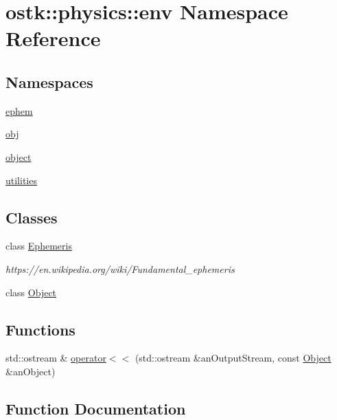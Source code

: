 \hypertarget{namespaceostk_1_1physics_1_1env}{}\section{ostk\+:\+:physics\+:\+:env Namespace Reference}
\label{namespaceostk_1_1physics_1_1env}
\subsection*{Namespaces}
\begin{DoxyCompactItemize}
\item 
 \hyperlink{namespaceostk_1_1physics_1_1env_1_1ephem}{ephem}
\item 
 \hyperlink{namespaceostk_1_1physics_1_1env_1_1obj}{obj}
\item 
 \hyperlink{namespaceostk_1_1physics_1_1env_1_1object}{object}
\item 
 \hyperlink{namespaceostk_1_1physics_1_1env_1_1utilities}{utilities}
\end{DoxyCompactItemize}
\subsection*{Classes}
\begin{DoxyCompactItemize}
\item 
class \hyperlink{classostk_1_1physics_1_1env_1_1_ephemeris}{Ephemeris}
\begin{DoxyCompactList}\small\item\em https\+://en.wikipedia.\+org/wiki/\+Fundamental\+\_\+ephemeris \end{DoxyCompactList}\item 
class \hyperlink{classostk_1_1physics_1_1env_1_1_object}{Object}
\end{DoxyCompactItemize}
\subsection*{Functions}
\begin{DoxyCompactItemize}
\item 
std\+::ostream \& \hyperlink{namespaceostk_1_1physics_1_1env_a0bb0f1fd6461af37e9a44873b12fc615}{operator$<$$<$} (std\+::ostream \&an\+Output\+Stream, const \hyperlink{classostk_1_1physics_1_1env_1_1_object}{Object} \&an\+Object)
\end{DoxyCompactItemize}


\subsection{Function Documentation}
\mbox{\label{namespaceostk_1_1physics_1_1env_a0bb0f1fd6461af37e9a44873b12fc615}} 
